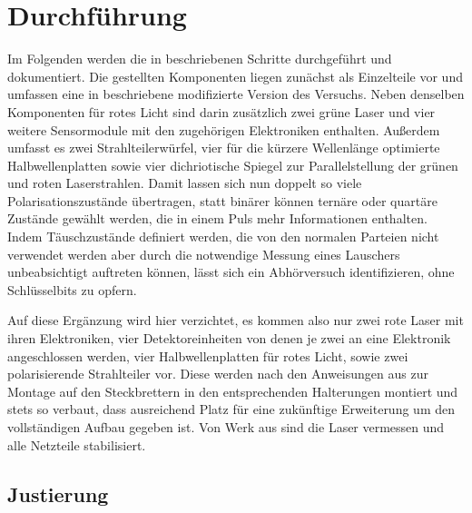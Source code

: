 \newpage
\section{Durchführung}

Im Folgenden werden die in \cite{krypt} beschriebenen Schritte durchgeführt und dokumentiert. Die gestellten Komponenten liegen zunächst
als Einzelteile vor und umfassen eine in \cite{Riggs_2022} beschriebene modifizierte Version des Versuchs. Neben denselben Komponenten
für rotes Licht sind darin zusätzlich zwei grüne Laser und vier weitere Sensormodule mit den zugehörigen Elektroniken enthalten. Außerdem
umfasst es zwei Strahlteilerwürfel, vier für die kürzere Wellenlänge optimierte Halbwellenplatten sowie vier dichriotische Spiegel zur
Parallelstellung der grünen und roten Laserstrahlen. Damit lassen sich nun doppelt so viele Polarisationszustände übertragen, statt
binärer können ternäre oder quartäre Zustände gewählt werden, die in einem Puls mehr Informationen enthalten. Indem Täuschzustände
definiert werden, die von den normalen Parteien nicht verwendet werden aber durch die notwendige Messung eines Lauschers unbeabsichtigt
auftreten können, lässt sich ein Abhörversuch identifizieren, ohne Schlüsselbits zu opfern.

Auf diese Ergänzung wird hier verzichtet, es kommen also nur zwei rote Laser mit ihren Elektroniken, vier Detektoreinheiten von denen
je zwei an eine Elektronik angeschlossen werden, vier Halbwellenplatten für rotes Licht, sowie zwei polarisierende Strahlteiler vor.
Diese werden nach den Anweisungen aus \cite{krypt} zur Montage auf den Steckbrettern in den entsprechenden Halterungen montiert und
stets so verbaut, dass ausreichend Platz für eine zukünftige Erweiterung um den vollständigen Aufbau gegeben ist. Von Werk aus sind
die Laser vermessen und alle Netzteile stabilisiert.



\subsection{Justierung}

